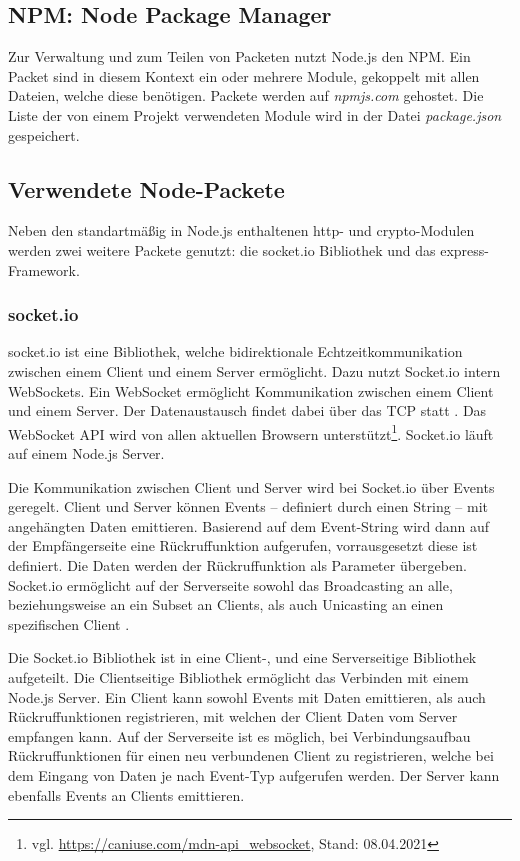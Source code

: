 \subsection{NPM: Node Package Manager}
Zur Verwaltung und zum Teilen von Packeten nutzt Node.js den \ac{NPM}. Ein Packet sind in diesem Kontext ein oder mehrere Module, gekoppelt mit allen Dateien, welche diese benötigen. Packete werden auf \textit{npmjs.com} gehostet. Die Liste der von einem Projekt verwendeten Module wird in der Datei \textit{package.json} gespeichert.

\subsection{Verwendete Node-Packete}
Neben den standartmäßig in Node.js enthaltenen \glqq{}http\grqq{}- und \glqq{}crypto\grqq{}-Modulen werden zwei weitere Packete genutzt: die \glqq{}socket.io\grqq{} Bibliothek und das \glqq{}express\grqq{}-Framework.

\subsubsection{socket.io}
\glqq{}socket.io\grqq{} ist eine Bibliothek, welche bidirektionale Echtzeitkommunikation zwischen einem Client und einem Server ermöglicht. Dazu nutzt Socket.io intern WebSockets\cite{socketio}. Ein WebSocket ermöglicht Kommunikation zwischen einem Client und einem Server. Der Datenaustausch findet dabei über das \ac{TCP} statt \cite{websocketRFC}. Das WebSocket \ac{API} wird von allen aktuellen Browsern unterstützt\footnote{vgl. \url{https://caniuse.com/mdn-api_websocket}, Stand: 08.04.2021}. Socket.io läuft auf einem Node.js Server\cite{socketio}.\par

Die Kommunikation zwischen Client und Server wird bei Socket.io über Events geregelt. Client und Server können Events -- definiert durch einen String -- mit angehängten Daten emittieren. Basierend auf dem Event-String wird dann auf der Empfängerseite eine Rückruffunktion aufgerufen, vorrausgesetzt diese ist definiert. Die Daten werden der Rückruffunktion als Parameter übergeben. Socket.io ermöglicht auf der Serverseite sowohl das Broadcasting an alle, beziehungsweise an ein Subset an Clients, als auch Unicasting an einen spezifischen Client \cite{socketio}.\par

Die Socket.io Bibliothek ist in eine Client-, und eine Serverseitige Bibliothek aufgeteilt. Die Clientseitige Bibliothek ermöglicht das Verbinden mit einem Node.js Server. Ein Client kann sowohl Events mit Daten emittieren, als auch Rückruffunktionen registrieren, mit welchen der Client Daten vom Server empfangen kann. Auf der Serverseite ist es möglich, bei Verbindungsaufbau Rückruffunktionen für einen neu verbundenen Client zu registrieren, welche bei dem Eingang von Daten je nach Event-Typ aufgerufen werden. Der Server kann ebenfalls Events an Clients emittieren.


